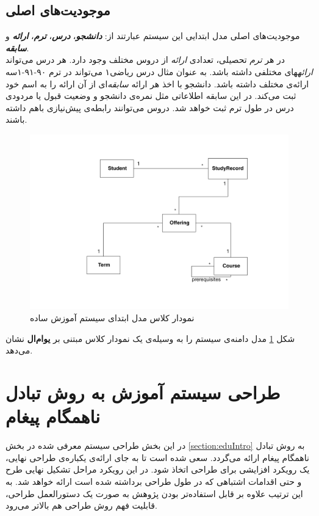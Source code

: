 \subsection{موجودیت‌های اصلی}
\label{subsec:mainEntities}
 موجودیت‌های اصلی  مدل ابتدایی این سیستم عبارتند از:
\textbf{\textit{دانشجو}}، \textbf{\textit{درس}}، \textbf{\textit{ترم}}، \textbf{\textit{ارائه}} و \textbf{\textit{سابقه}}.\\
در هر \textit{ترم} تحصیلی، تعدادی \textit{ارائه} از دروس مختلف وجود دارد. هر درس می‌تواند \textit{ارائه}های مختلفی داشته باشد. به عنوان مثال درس ریاضی۱ می‌تواند در ترم ۹۰-۹۱-۱سه ارائه‌ی مختلف داشته باشد. دانشجو با اخذ هر ارائه \textit{سابقه}‌ای از آن ارائه را به اسم خود ثبت می‌کند. در این سابقه اطلاعاتی مثل نمره‌ی دانشجو و وضعیت قبول یا مردودی درس در طول ترم ثبت خواهد شد. دروس می‌توانند رابطه‌ی پیش‌نیازی باهم داشته باشند. 
\begin{figure}
    \begin{center}
	\includegraphics[width=16cm]{4-ProposedFramework/Figures/SimpleClassDiagram.pdf}
    \end{center}
    \caption{\label{fig:edu_class1} نمودار کلاس مدل ابتدای سیستم آموزش ساده }
\end{figure}
شکل \ref{fig:edu_class1} مدل دامنه‌ی سیستم را به وسیله‌ی یک نمودار کلاس مبتنی بر \textbf{یو‌ام‌ال} نشان می‌دهد.

\newpage
\section{طراحی سیستم آموزش به روش تبادل ناهمگام پیغام}
در این بخش طراحی سیستم معرفی شده در بخش \ref{section:eduIntro} به روش تبادل ناهمگام پیغام ارائه می‌گردد. سعی شده است تا به جای ارائه‌ی یکباره‌ی طراحی نهایی، یک رویکرد \gls{افزایشی} برای طراحی اتخاذ شود. در این رویکرد مراحل تشکیل نهایی طرح و حتی اقدامات اشتباهی که در طول طراحی برداشته شده است ارائه خواهد شد. به  این ترتیب علاوه بر قابل استفاده‌تر بودن پژوهش به صورت یک دستورالعمل  طراحی، قابلیت فهم روش طراحی هم بالاتر می‌رود.
